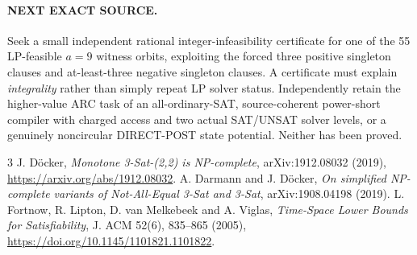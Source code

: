 \documentclass[11pt]{article}
\begin{document}
\paragraph{NEXT EXACT SOURCE.}
Seek a small independent rational integer-infeasibility certificate for one of the 55 LP-feasible $a=9$ witness orbits, exploiting the forced three positive singleton clauses and at-least-three negative singleton clauses. A certificate must explain \emph{integrality} rather than simply repeat LP solver status. Independently retain the higher-value ARC task of an all-ordinary-SAT, source-coherent power-short compiler with charged access and two actual SAT/UNSAT solver levels, or a genuinely noncircular DIRECT-POST state potential. Neither has been proved.

\begin{thebibliography}{3}
 J. D\"ocker, \emph{Monotone 3-Sat-(2,2) is NP-complete}, arXiv:1912.08032 (2019), \url{https://arxiv.org/abs/1912.08032}.
 A. Darmann and J. D\"ocker, \emph{On simplified NP-complete variants of Not-All-Equal 3-Sat and 3-Sat}, arXiv:1908.04198 (2019).
 L. Fortnow, R. Lipton, D. van Melkebeek and A. Viglas, \emph{Time-Space Lower Bounds for Satisfiability}, J. ACM 52(6), 835--865 (2005), \url{https://doi.org/10.1145/1101821.1101822}.
\end{thebibliography}
\end{document}

